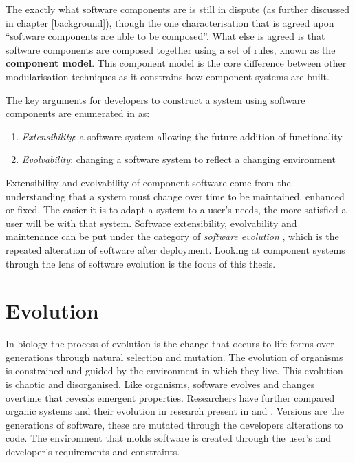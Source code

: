 The exactly what software components are is still in dispute (as further discussed in chapter \ref{background}),
though the one characterisation that is agreed upon ``software components are able to be composed''.
What else is agreed is that software components are composed together using a set of rules, known as the \textbf{component model}.
This component model is the core difference between other modularisation techniques as it constrains how component systems are built.

The key arguments for developers to construct a system using software components are enumerated in \citep{Szyperski2000} as:
\begin{enumerate}
	\item \textit{Extensibility}: a software system allowing the future addition of functionality
	\item \textit{Evolvability}: changing a software system to reflect a changing environment
\end{enumerate}

Extensibility and evolvability of component software come from the understanding that a system must change over time to be maintained, enhanced or fixed.
The easier it is to adapt a system to a user's needs, the more satisfied a user will be with that system.
Software extensibility, evolvability and maintenance can be put under the category of \textit{software evolution} \citep{lehman1980}, which is the repeated alteration of software after deployment.
Looking at component systems through the lens of software evolution is the focus of this thesis.

\section{Evolution}
In biology the process of evolution is the change that occurs to life forms over generations through natural selection and mutation.
The evolution of organisms is constrained and guided by the environment in which they live.
This evolution is chaotic and disorganised.
Like organisms, software evolves and changes overtime that reveals emergent properties.
Researchers have further compared organic systems and their evolution in research present in \citep{Myers2003} and \citep{Yan2010}.
Versions are the generations of software, these are mutated through the developers alterations to code.
The environment that molds software is created through the user's and developer's requirements and constraints.

